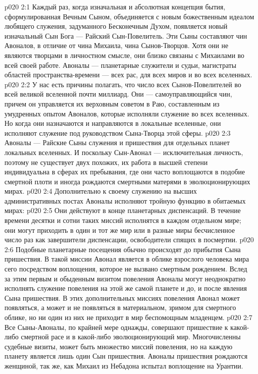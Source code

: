 \vs p020 2:1 Каждый раз, когда изначальная и абсолютная концепция бытия, сформулированная Вечным Сыном, объединяется с новым божественным идеалом любящего служения, задуманного Бесконечным Духом, появляется новый изначальный Сын Бога --- Райский Сын\hyp{}Повелитель. Эти Сыны составляют чин Авоналов, в отличие от чина Михаила, чина Сынов\hyp{}Творцов. Хотя они не являются творцами в личностном смысле, они близко связаны с Михаилами во всей своей работе. Авоналы --- планетарные служители и судьи, магистраты областей пространства\hyp{}времени --- всех рас, для всех миров и во всех вселенных.
\vs p020 2:2 У нас есть причины полагать, что число всех Сынов\hyp{}Повелителей во всей великой вселенной почти миллиард. Они --- самоуправляющийся чин, причем он управляется их верховным советом в Раю, составленным из умудренных опытом Авоналов, которые исполняли служение во всех вселенных. Но когда они назначаются и направляются в локальные вселенные, они исполняют служение под руководством Сына\hyp{}Творца этой сферы.
\vs p020 2:3 Авоналы --- Райские Сыны служения и пришествия для отдельных планет локальных вселенных. И поскольку Сын\hyp{}Авонал --- исключительная личность, поэтому не существует двух похожих, их работа в высшей степени индивидуальна в сферах их пребывания, где они часто воплощаются в подобие смертной плоти и иногда рождаются смертными матерями в эволюционирующих мирах.
\vs p020 2:4 \pc Дополнительно к своему служению на высших административных постах Авоналы исполняют тройную функцию в обитаемых мирах:
\vs p020 2:5 \bibnobreakspace {} Они действуют в конце планетарных диспенсаций. В течение времени десятки и сотни таких миссий исполнятся в каждом отдельном мире; они могут приходить в один и тот же мир или в разные миры бесчисленное число раз как завершители диспенсации, освободители спящих в посмертии.
\vs p020 2:6 \bibnobreakspace {} Подобные планетарные посещения обычно происходят до прибытия Сына пришествия. В такой миссии Авонал является в облике взрослого человека мира сего посредством воплощения, которое не вызвано смертным рождением. Вслед за этим первым и обыденным визитом повеления Авоналы могут неоднократно исполнять служение повеления на этой же самой планете и до, и после явления Сына пришествия. В этих дополнительных миссиях повеления Авонал может появляться, а может и не появляться в материальном, зримом для смертного облике, но ни один из них не приходит в мир беспомощным младенцем.
\vs p020 2:7 \bibnobreakspace {} Все Сыны\hyp{}Авоналы, по крайней мере однажды, совершают пришествие к какой\hyp{}либо смертной расе и в какой\hyp{}либо эволюционирующий мир. Многочисленны судебные визиты, может быть множество миссий повеления, но на каждую планету является лишь один Сын пришествия. Авоналы пришествия рождаются женщиной, так же, как Михаил из Небадона испытал воплощение на Урантии.
